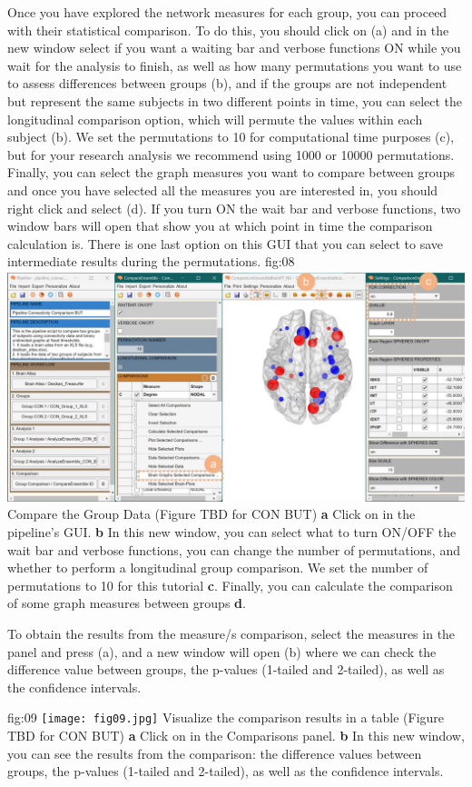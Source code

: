 \documentclass[justified]{tufte-handout}
\begin{document}
Once you have explored the network measures for each group, you can proceed with their statistical comparison. To do this, you should click on  (a) and in the new window select if you want a waiting bar and verbose functions ON while you wait for the analysis to finish, as well as how many permutations you want to use to assess differences between groups ({b}), and if the groups are not independent but represent the same subjects in two different points in time, you can select the longitudinal comparison option, which will permute the values within each subject ({b}). We set the permutations to 10 for computational time purposes ({c}), but for your research analysis we recommend using 1000 or 10000 permutations. Finally, you can select the graph measures you want to compare between groups and once you have selected all the measures you are interested in, you should right click and select  ({d}). If you turn ON the wait bar and verbose functions, two window bars will open that show you at which point in time the comparison calculation is. There is one last option on this GUI that you can select to save intermediate results during the permutations.
	{fig:08}
	{
	\includegraphics{fig08.jpg}
	}
	{Compare the Group Data (Figure TBD for CON BUT)}
	{
	{\bf a} Click on  in the pipeline's GUI.
	{\bf b} In this new window, you can select what to turn ON/OFF the wait bar and verbose functions, you can change the number of permutations, and whether to perform a longitudinal group comparison. We set the number of permutations to 10 for this tutorial {\bf c}. Finally, you can calculate the comparison of some graph measures between groups {\bf d}.
	}
 
To obtain the results from the measure/s comparison, select the measures in the  panel and press ({a}), and a new window will open ({b}) where we can check the difference value between groups, the p-values (1-tailed and 2-tailed), as well as the confidence intervals.

	{fig:09}
	{
	\texttt{[image: fig09.jpg]}
	}
	{Visualize the comparison results in a table (Figure TBD for CON BUT)}
	{
	{\bf a} Click on  in the Comparisons panel.
	{\bf b} In this new window, you can see the results from the comparison: the difference values between groups, the p-values (1-tailed and 2-tailed), as well as the confidence intervals.
	}
\end{document}
